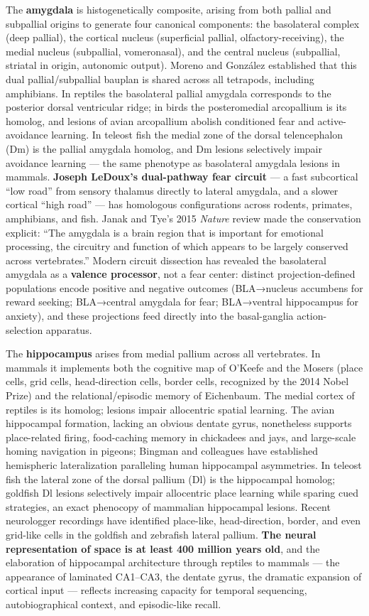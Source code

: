 The \textbf{amygdala} is histogenetically composite, arising from both pallial and subpallial origins to generate four canonical components: the basolateral complex (deep pallial), the cortical nucleus (superficial pallial, olfactory-receiving), the medial nucleus (subpallial, vomeronasal), and the central nucleus (subpallial, striatal in origin, autonomic output). Moreno and González established that this dual pallial/subpallial bauplan is shared across all tetrapods, including amphibians. In reptiles the basolateral pallial amygdala corresponds to the posterior dorsal ventricular ridge; in birds the posteromedial arcopallium is its homolog, and lesions of avian arcopallium abolish conditioned fear and active-avoidance learning. In teleost fish the medial zone of the dorsal telencephalon (Dm) is the pallial amygdala homolog, and Dm lesions selectively impair avoidance learning --- the same phenotype as basolateral amygdala lesions in mammals. \textbf{Joseph LeDoux's dual-pathway fear circuit} --- a fast subcortical ``low road'' from sensory thalamus directly to lateral amygdala, and a slower cortical ``high road'' --- has homologous configurations across rodents, primates, amphibians, and fish. Janak and Tye's 2015 \emph{Nature} review made the conservation explicit: ``The amygdala is a brain region that is important for emotional processing, the circuitry and function of which appears to be largely conserved across vertebrates.'' Modern circuit dissection has revealed the basolateral amygdala as a \textbf{valence processor}, not a fear center: distinct projection-defined populations encode positive and negative outcomes (BLA→nucleus accumbens for reward seeking; BLA→central amygdala for fear; BLA→ventral hippocampus for anxiety), and these projections feed directly into the basal-ganglia action-selection apparatus.

The \textbf{hippocampus} arises from medial pallium across all vertebrates. In mammals it implements both the cognitive map of O'Keefe and the Mosers (place cells, grid cells, head-direction cells, border cells, recognized by the 2014 Nobel Prize) and the relational/episodic memory of Eichenbaum. The medial cortex of reptiles is its homolog; lesions impair allocentric spatial learning. The avian hippocampal formation, lacking an obvious dentate gyrus, nonetheless supports place-related firing, food-caching memory in chickadees and jays, and large-scale homing navigation in pigeons; Bingman and colleagues have established hemispheric lateralization paralleling human hippocampal asymmetries. In teleost fish the lateral zone of the dorsal pallium (Dl) is the hippocampal homolog; goldfish Dl lesions selectively impair allocentric place learning while sparing cued strategies, an exact phenocopy of mammalian hippocampal lesions. Recent neurologger recordings have identified place-like, head-direction, border, and even grid-like cells in the goldfish and zebrafish lateral pallium. \textbf{The neural representation of space is at least 400 million years old}, and the elaboration of hippocampal architecture through reptiles to mammals --- the appearance of laminated CA1--CA3, the dentate gyrus, the dramatic expansion of cortical input --- reflects increasing capacity for temporal sequencing, autobiographical context, and episodic-like recall.

